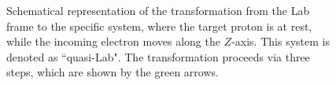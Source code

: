 \begin{figure}[!ht]
\begin{center}
\end{center}
\caption{\small Schematical representation of the transformation from the Lab frame to the specific system, where the target proton is at rest, while the incoming electron moves along the $Z$-axis. This system is denoted as ``quasi-Lab". The transformation proceeds via three steps, which are shown by the green arrows.   }
\label{fig:transf_proc}
\end{figure}



